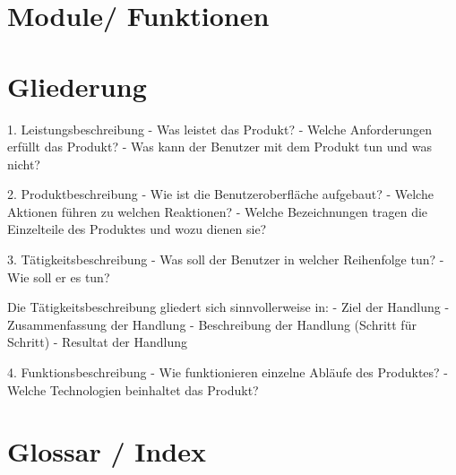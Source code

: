 \documentclass[10pt]{scrreprt}
\begin{document}
\chapter{Module/ Funktionen}












\chapter{Gliederung}


1. Leistungsbeschreibung
- Was leistet das Produkt?
- Welche Anforderungen erfüllt das Produkt?
- Was kann der Benutzer mit dem Produkt tun und was nicht?

2. Produktbeschreibung
- Wie ist die Benutzeroberfläche aufgebaut?
- Welche Aktionen führen zu welchen Reaktionen?
- Welche Bezeichnungen tragen die Einzelteile des Produktes und wozu dienen sie?

3. Tätigkeitsbeschreibung
- Was soll der Benutzer in welcher Reihenfolge tun?
- Wie soll er es tun?

Die Tätigkeitsbeschreibung gliedert sich sinnvollerweise in:
- Ziel der Handlung
- Zusammenfassung der Handlung
- Beschreibung der Handlung (Schritt für Schritt)
- Resultat der Handlung

4. Funktionsbeschreibung
- Wie funktionieren einzelne Abläufe des Produktes?
- Welche Technologien beinhaltet das Produkt?



\chapter*{Glossar / Index}
\end{document}
